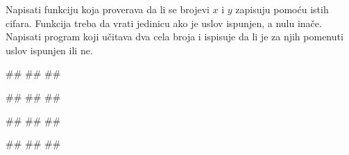 \begin{Exercise}[label=FUN_15] 
Napisati funkciju  koja proverava da li
se brojevi $x$ i $y$ zapisuju pomoću istih cifara. Funkcija treba da
vrati jedinicu ako je uslov ispunjen, a nulu inače. Napisati
program koji učitava dva cela broja i ispisuje da li je za njih 
pomenuti uslov ispunjen ili ne.

\begin{miditest}
\begin{upotreba}{1}
#\naslovInt#
##
##
\end{upotreba}
\end{miditest}
\begin{miditest}
\begin{upotreba}{2}
#\naslovInt#
##
##
\end{upotreba}
\end{miditest}

\begin{miditest}
\begin{upotreba}{3}
#\naslovInt#
##
##
\end{upotreba}
\end{miditest}
\begin{miditest}
\begin{upotreba}{4}
#\naslovInt#
##
##
\end{upotreba}
\end{miditest} 

\end{Exercise}
\ifresenja 
\begin{Answer}[ref=FUN_15]
\end{Answer} 
\fi


